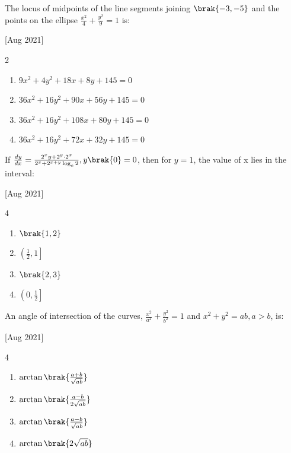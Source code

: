     \item The locus of midpoints of the line segments joining $\brak{-3,-5}$ and the points on the ellipse $\frac{x^2}{4}+\frac{y^2}{9}=1$ is:
    
    \hfill{[Aug 2021]}

        \begin{multicols}{2}
            \begin{enumerate}
                \item $9x^2+4y^2+18x+8y+145=0$
                \item $36x^2+16y^2+90x+56y+145=0$
                \item $36x^2+16y^2+108x+80y+145=0$
                \item $36x^2+16y^2+72x+32y+145=0$
            \end{enumerate}
        \end{multicols}

    \item If $\frac{dy}{dx}=\frac{2^xy+2^y\cdot 2^x}{2^x+2^{x+y}\log_e2}, y\brak{0}=0$, then for $y=1$, the value of x lies in the interval:
    
    
    \hfill{[Aug 2021]}

        \begin{multicols}{4}
            \begin{enumerate}
                \item $\brak{1,2}$
                \item $\left( \frac{1}{2},1\right]$
                \item  $\brak{2,3}$
                \item $\left( 0,\frac{1}{2}\right]$
            \end{enumerate}
        \end{multicols}
        
    \item An angle of intersection of the curves, $\frac{x^2}{a^2}+\frac{y^2}{b^2}=1$ and $x^2+y^2=ab,a>b$, is:
    
    \hfill{[Aug 2021]}

        \begin{multicols}{4}
            \begin{enumerate}
                \item $\arctan\brak{\frac{a+b}{\sqrt{ab}}}$
                \item $\arctan\brak{\frac{a-b}{2\sqrt{ab}}}$
                \item $\arctan\brak{\frac{a-b}{\sqrt{ab}}}$
                \item $\arctan\brak{2\sqrt{ab}}$
            \end{enumerate}
        \end{multicols}

